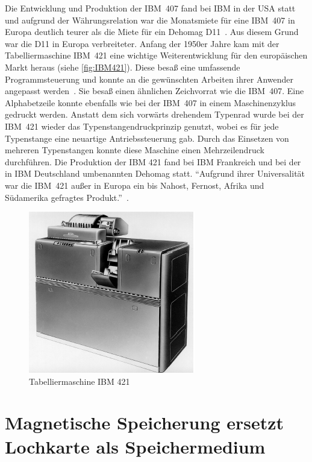 \documentclass[parskip=half]{scrartcl}
\begin{document}
Die Entwicklung und Produktion der IBM~407 fand bei IBM in der USA statt und
aufgrund der Währungsrelation war die Monatsmiete für eine IBM~407 in Europa
deutlich teurer als die Miete für ein Dehomag D11~\cite{sandner}. Aus diesem
Grund war die D11 in Europa verbreiteter. Anfang der 1950er Jahre kam mit der
Tabelliermaschine IBM~421 eine wichtige Weiterentwicklung für den europäischen
Markt heraus (siehe \autoref{fig:IBM421}). Diese besaß eine umfassende
Programmsteuerung und konnte an die gewünschten Arbeiten ihrer Anwender
angepasst werden~\cite{deutschesMuseum}. Sie besaß einen ähnlichen Zeichvorrat
wie die IBM~407. Eine Alphabetzeile konnte ebenfalls wie bei der IBM~407 in
einem Maschinenzyklus gedruckt werden. Anstatt dem sich vorwärts drehendem
Typenrad wurde bei der IBM~421 wieder das Typenstangendruckprinzip genutzt,
wobei es für jede Typenstange eine neuartige Antriebssteuerung gab. Durch das
Einsetzen von mehreren Typenstangen konnte diese Maschine einen Mehrzeilendruck
durchführen. Die Produktion der IBM 421 fand bei IBM Frankreich und bei der in
IBM Deutschland umbenannten Dehomag statt. \enquote{Aufgrund ihrer
Universalität war die IBM~421 außer in Europa ein bis Nahost, Fernost, Afrika
und Südamerika gefragtes Produkt.}~\cite{sandner}.

\begin{figure}[h]
  \centering
  \includegraphics{IBM421}
  \caption{Tabelliermaschine IBM 421~\cite{sandner}}
  \label{fig:IBM421}
\end{figure}

\section{Magnetische Speicherung ersetzt Lochkarte als Speichermedium}
\end{document}
